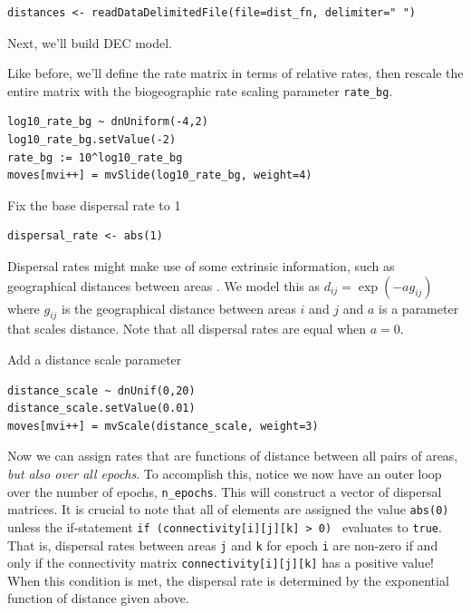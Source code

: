 \begin{snugshade}
\begin{lstlisting}
distances <- readDataDelimitedFile(file=dist_fn, delimiter=" ")
\end{lstlisting}
\end{snugshade}


Next, we'll build DEC model.

Like before, we'll define the rate matrix in terms of relative rates, then rescale the entire matrix with the biogeographic rate scaling parameter {\tt rate\_bg}.

\begin{snugshade}
\begin{lstlisting}
log10_rate_bg ~ dnUniform(-4,2)
log10_rate_bg.setValue(-2)
rate_bg := 10^log10_rate_bg
moves[mvi++] = mvSlide(log10_rate_bg, weight=4)
\end{lstlisting}
\end{snugshade}


Fix the base dispersal rate to 1

\begin{snugshade}
\begin{lstlisting}
dispersal_rate <- abs(1)
\end{lstlisting}
\end{snugshade}

Dispersal rates might make use of some extrinsic information, such as geographical distances between areas \citep{MacArthur1967, Webb2012}.
We model this as $d_{ij} = \exp(-a g_{ij})$ where $g_{ij}$ is the geographical distance between areas $i$ and $j$ and $a$ is a parameter that scales distance.
Note that all dispersal rates are equal when $a=0$.

Add a distance scale parameter

\begin{snugshade}
\begin{lstlisting}
distance_scale ~ dnUnif(0,20)
distance_scale.setValue(0.01)
moves[mvi++] = mvScale(distance_scale, weight=3)
\end{lstlisting}
\end{snugshade}

Now we can assign rates that are functions of distance between all pairs of areas, {\it but also over all epochs}.
To accomplish this, notice we now have an outer loop over the number of epochs, {\tt n\_epochs}.
This will construct a vector of dispersal matrices.
It is crucial to note that all of elements are assigned the value {\tt abs(0)} unless the if-statement {\tt if (connectivity[i][j][k] > 0) } evaluates to {\tt true}.
That is, dispersal rates between areas {\tt j} and {\tt k} for epoch {\tt i} are non-zero if and only if the connectivity matrix {\tt connectivity[i][j][k]} has a positive value!
When this condition is met, the dispersal rate is determined by the exponential function of distance given above.


